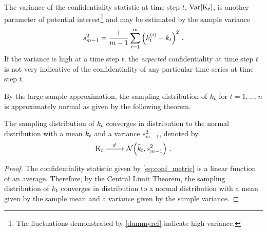 \documentclass[ ../main.tex]{subfiles}
\begin{document}
The variance of the confidentiality statistic at time step $t$, $\operatorname{\rm{Var}}[\mathrm{K}_t]$, is another parameter of potential interest\footnote{The fluctuations demonstrated by \cref{dummyref} indicate high variance.} and may be estimated by the sample variance
\begin{equation}
    s_{m-1}^2 = \frac{1}{m-1} \sum_{i=1}^{m} \left(k_t^{(i)} - \bar{k}_t\right)^2\,.
\end{equation}
If the variance is high at a time step $t$, the \emph{expected} confidentiality at time step $t$ is not very indicative of the confidentiality of any particular time series at time step $t$.

By the large sample approximation, the sampling distribution of $k_t$ for $t=1,\ldots,n$ is approximately normal as given by the following theorem.
\begin{theorem}
\label{thm:normal}
The sampling distribution of $k_t$ converges in distribution to the normal distribution with a mean $\bar{k}_t$ and a variance $s_{m-1}^2$, denoted by
\begin{equation}
    \VarConf_t \dconverges{d} \mathcal{N}\!\left(\bar{\Conf}_t, s_{m-1}^2\right)\,.
\end{equation}
\end{theorem}
\begin{proof}
The confidentiality statistic given by \cref{eq:conf_metric} is a linear function of an average. Therefore, by the Central Limit Theorem, the sampling distribution of $k_t$ converges in distribution to a normal distribution with a mean given by the sample mean and a variance given by the sample variance.
\end{proof}
\end{document}
